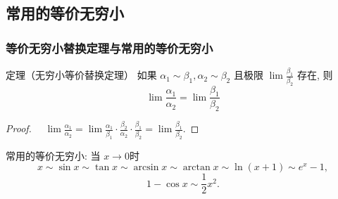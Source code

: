 \documentclass[
10pt,
aspectratio=43,
]{beamer}
\begin{document}
\subsection{常用的等价无穷小}

\begin{frame}
	\frametitle{等价无穷小替换定理与常用的等价无穷小}
	
	\begin{block}{定理（无穷小等价替换定理）}
		如果 $\alpha_{1 }\sim \beta_1, \alpha_{2 }\sim \beta_2$ 且极限 $\lim \frac{\beta_1}{\beta_2}$ 存在, 则
		$$
		\lim \frac{\alpha_1}{\alpha_2}=\lim \frac{\beta_1}{\beta_2}
		$$
	\end{block}
	\pause
	\begin{proof} 
		$\quad\displaystyle \lim \frac{\alpha_1}{\alpha_2}=\lim \frac{\alpha_1}{\beta_1} \cdot \frac{\beta_2}{\alpha_2} \cdot \frac{\beta_1}{\beta_2}=\lim \frac{\beta_1}{\beta_2}$.
		
	\end{proof}
	\pause
	常用的等价无穷小:
	当 $x \rightarrow 0$时
	$$
	x \sim \sin x \sim \tan x \sim \arcsin x \sim \arctan x \sim \ln (x+1) \sim e^x-1,
	$$
	$$
	1-\cos x \sim \frac{1}{2} x^2.
	$$
	
\end{frame}
\end{document}
